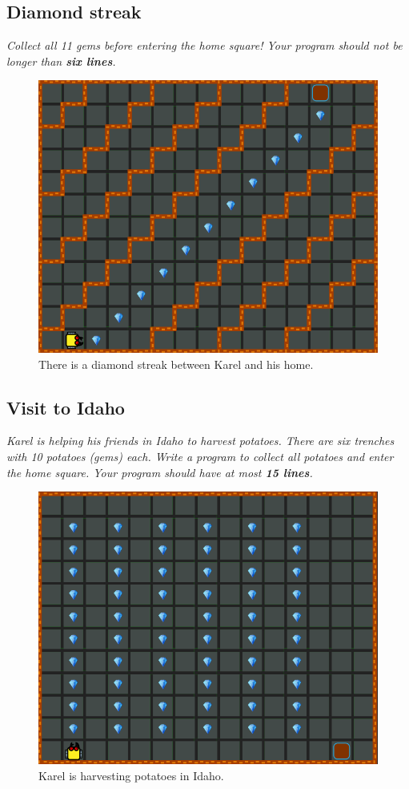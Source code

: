 \subsection{Diamond streak}

{\em Collect all 11 gems before entering the home square! Your program should not be longer than {\bf six lines}.}\\[-7mm]

\begin{figure}[!ht]
\begin{center}
\includegraphics[height=0.4\textwidth]{img/c02.png}
\end{center}
\vspace{-4mm}
\caption{There is a diamond streak between Karel and his home.}
\label{fig:c02}
\vspace{-10mm}
\end{figure}
\noindent

\newpage

\subsection{Visit to Idaho}

{\em Karel is helping his friends in Idaho to harvest potatoes. There are six trenches with 10 potatoes (gems) each. Write a program to collect all potatoes and enter the home square. Your program should have at most {\bf 15 lines}.}\\[-7mm]

\begin{figure}[!ht]
\begin{center}
\includegraphics[height=0.4\textwidth]{img/c03.png}
\end{center}
\vspace{-4mm}
\caption{Karel is harvesting potatoes in Idaho.}
\label{fig:c03}
\vspace{-10mm}
\end{figure}
\noindent

